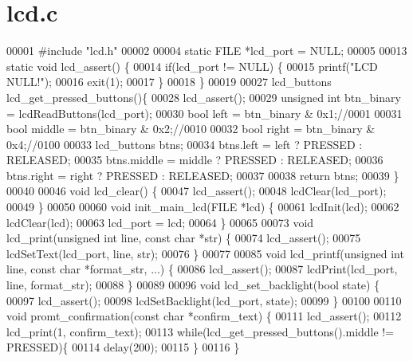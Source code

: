 \section{lcd.\+c}
\label{lcd_8c_source}

\begin{DoxyCode}
00001 \textcolor{preprocessor}{#include "lcd.h"}
00002 
00004 \textcolor{keyword}{static} FILE *lcd_port = NULL;
00005 
00013  \textcolor{keyword}{static} \textcolor{keywordtype}{void} lcd_assert() \{
00014   \textcolor{keywordflow}{if}(lcd_port != NULL) \{
00015     printf(\textcolor{stringliteral}{"LCD NULL!"});
00016     exit(1);
00017   \}
00018 \}
00019 
00027 lcd_buttons lcd_get_pressed_buttons()\{
00028   lcd_assert();
00029   \textcolor{keywordtype}{unsigned} \textcolor{keywordtype}{int} btn\_binary = lcdReadButtons(lcd_port);
00030   \textcolor{keywordtype}{bool} left = btn\_binary & 0x1;\textcolor{comment}{//0001}
00031   \textcolor{keywordtype}{bool} middle = btn\_binary & 0x2;\textcolor{comment}{//0010}
00032   \textcolor{keywordtype}{bool} right = btn\_binary & 0x4;\textcolor{comment}{//0100}
00033   lcd_buttons btns;
00034   btns.left = left ? PRESSED : RELEASED;
00035   btns.middle = middle ? PRESSED : RELEASED;
00036   btns.right = right ? PRESSED : RELEASED;
00037 
00038   \textcolor{keywordflow}{return} btns;
00039 \}
00040 
00046 \textcolor{keywordtype}{void} lcd_clear() \{
00047   lcd_assert();
00048   lcdClear(lcd_port);
00049 \}
00050 
00060 \textcolor{keywordtype}{void} init_main_lcd(FILE *lcd) \{
00061   lcdInit(lcd);
00062   lcdClear(lcd);
00063   lcd_port = lcd;
00064 \}
00065 
00073 \textcolor{keywordtype}{void} lcd_print(\textcolor{keywordtype}{unsigned} \textcolor{keywordtype}{int} line, \textcolor{keyword}{const} \textcolor{keywordtype}{char} *str) \{
00074   lcd_assert();
00075   lcdSetText(lcd_port, line, str);
00076 \}
00077 
00085 \textcolor{keywordtype}{void} lcd_printf(\textcolor{keywordtype}{unsigned} \textcolor{keywordtype}{int} line, \textcolor{keyword}{const} \textcolor{keywordtype}{char} *format\_str, ...) \{
00086   lcd_assert();
00087   lcdPrint(lcd_port, line, format\_str);
00088 \}
00089 
00096 \textcolor{keywordtype}{void} lcd_set_backlight(\textcolor{keywordtype}{bool} state) \{
00097   lcd_assert();
00098   lcdSetBacklight(lcd_port, state);
00099 \}
00100 
00110 \textcolor{keywordtype}{void} promt_confirmation(\textcolor{keyword}{const} \textcolor{keywordtype}{char} *confirm\_text) \{
00111   lcd_assert();
00112   lcd_print(1, confirm\_text);
00113   \textcolor{keywordflow}{while}(lcd_get_pressed_buttons().middle != PRESSED)\{
00114     delay(200);
00115   \}
00116 \}
\end{DoxyCode}
